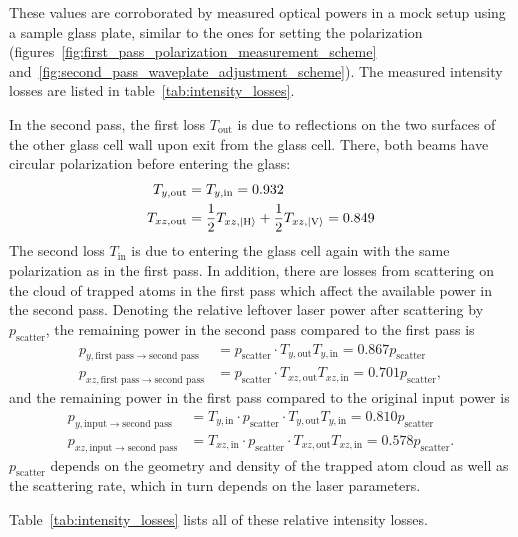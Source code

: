 These values are corroborated by measured optical powers in a mock setup using a sample glass plate, similar to the ones for setting the polarization (figures~\ref{fig:first_pass_polarization_measurement_scheme} and~\ref{fig:second_pass_waveplate_adjustment_scheme}). The measured intensity losses are listed in table~\ref{tab:intensity_losses}.

In the second pass, the first loss $T_{\text{out}}$ is due to reflections on the two surfaces of the other glass cell wall upon exit from the glass cell. There, both beams have circular polarization before entering the glass:
\begin{align}
    T_{y, \text{out}} &= T_{y, \text{in}} = 0.932 \\
    T_{xz, \text{out}} &= \frac{1}{2} T_{xz, \Ket{\text{H}}} + \frac{1}{2} T_{xz, \Ket{\text{V}}} = 0.849
\end{align}
The second loss $T_{\text{in}}$ is due to entering the glass cell again with the same polarization as in the first pass. In addition, there are losses from scattering on the cloud of trapped atoms in the first pass which affect the available power in the second pass. Denoting the relative leftover laser power after scattering by $p_\text{scatter}$, the remaining power in the second pass compared to the first pass is
\begin{align}
    p_{y, \text{first pass} \rightarrow \text{second pass}} &= p_\text{scatter} \cdot T_{y, \text{out}} T_{y, \text{in}}   =  0.867 p_\text{scatter}\\
    p_{xz, \text{first pass} \rightarrow \text{second pass}} &= p_\text{scatter} \cdot T_{xz, \text{out}} T_{xz, \text{in}}   = 0.701 p_\text{scatter},
\end{align}
and the remaining power in the first pass compared to the original input power is
\begin{align}
    p_{y, \text{input} \rightarrow \text{second pass}} &= T_{y, \text{in}} \cdot p_\text{scatter} \cdot T_{y, \text{out}} T_{y, \text{in}} =  0.810 p_\text{scatter} \\
    p_{xz, \text{input} \rightarrow \text{second pass}} &= T_{xz, \text{in}} \cdot p_\text{scatter} \cdot T_{xz, \text{out}} T_{xz, \text{in}} = 0.578 p_\text{scatter}.
\end{align}
$p_\text{scatter}$ depends on the geometry and density of the trapped atom cloud as well as the scattering rate, which in turn depends on the laser parameters.

Table~\ref{tab:intensity_losses} lists all of these relative intensity losses.

